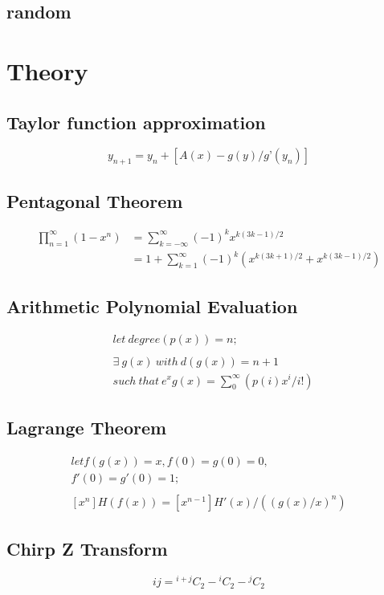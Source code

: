 \documentclass[a4paper, twocolumn]{article}
\newcommand*{\Comb}[2]{{}^{#1}C_{#2}}%
\begin{document}
\subsection{random}

\section{Theory}
\subsection{Taylor function approximation}
    \[ y_{n+1} = y_n+[{A(x)-g(y)}/g’(y_n)] \]
\subsection{Pentagonal Theorem}
    \begin{align*}
        \prod _{n=1}^{\infty }\left(1-x^{n}\right) 
            &= \sum _{k=-\infty }^{\infty }
                \left(-1\right)^{k}x^{k\left(3k-1\right)/2} \\
            &= 1+\sum _{k=1}^{\infty }(-1)^{k}
                \left(x^{k(3k+1)/2}+x^{k(3k-1)/2}\right)
    \end{align*}

\subsection{Arithmetic Polynomial Evaluation}
    \begin{align*}
        & let \ degree(p(x)) = n; \\ \\
        & \exists \ g(x) \ with \ d(g(x)) = n+1 \\ 
        & such \ that \ e^x g(x) = \sum_{0}^{\infty} (p(i)x^i/i!)
    \end{align*}

\subsection{Lagrange Theorem}
    \begin{gather*}
        let f(g(x)) = x, f(0)=g(0)=0,\\
        f'(0)=g'(0)=1; \\ \\
        [x^n]H(f(x)) = [x^{n-1}] H'(x)/((g(x)/x)^n)
    \end{gather*}

\subsection{Chirp Z Transform}
    \[ij = \Comb{i+j}{2}-\Comb{i}{2}-\Comb{j}{2} \]
\end{document}
